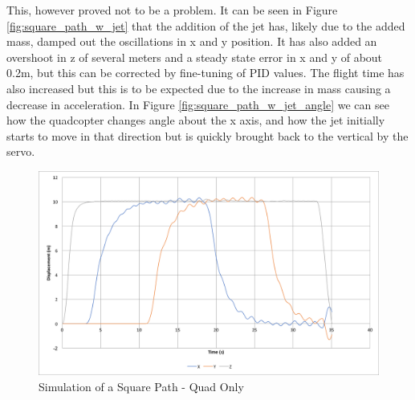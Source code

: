 \documentclass[11pt,twoside]{article}
\begin{document}
This, however proved not to be a problem. It can be seen in Figure \ref{fig:square_path_w_jet} that the addition of the jet has, likely due to the added mass, damped out the oscillations in x and y position. It has also added an overshoot in z of several meters and a steady state error in x and y of about 0.2m, but this can be corrected by fine-tuning of PID values. The flight time has also increased but this is to be expected due to the increase in mass causing a decrease in acceleration. In Figure \ref{fig:square_path_w_jet_angle} we can see how the quadcopter changes angle about the x axis, and how the jet initially starts to move in that direction but is quickly brought back to the vertical by the servo.

\begin{figure}
    \vspace{20em}
    \includegraphics[width=\linewidth]{square_path_quad_only}
    \caption{Simulation of a Square Path - Quad Only}
    \label{fig:square_path_quad_only}
\end{figure}
\end{document}
